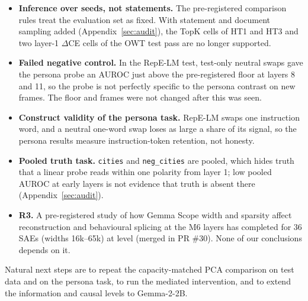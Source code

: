 \begin{itemize}
        persona, causal, capacity-matched PCA, truth-subspace and Gemma result is a validation finding. Three seeds share training data, so seed spread
        understates uncertainty, and fine-tuning criteria are applied per cell without multiplicity correction.
  \item \textbf{Inference over seeds, not statements.} The pre-registered comparison rules treat the evaluation set as
        fixed. With statement and document sampling added (Appendix~\ref{sec:audit}), the TopK cells of HT1 and HT3 and
        two layer-1 $\Delta$CE cells of the OWT test pass are no longer supported.
  \item \textbf{Failed negative control.} In the RepE-LM test, test-only neutral swaps gave the persona probe an AUROC
        just above the pre-registered floor at layers 8 and 11, so the probe is not perfectly specific to the persona
        contrast on new frames. The floor and frames were not changed after this was seen.
  \item \textbf{Construct validity of the persona task.} RepE-LM swaps one instruction word, and a neutral one-word
        swap loses as large a share of its signal, so the persona results measure instruction-token retention, not
        honesty.
  \item \textbf{Pooled truth task.} \texttt{cities} and \texttt{neg\_cities} are pooled, which hides truth that a
        linear probe reads within one polarity from layer 1; low pooled AUROC at early layers is not evidence that truth
        is absent there (Appendix~\ref{sec:audit}).
  \item \textbf{R3.} A pre-registered study of how Gemma Scope width and sparsity affect reconstruction and
        behavioural splicing at the M6 layers has completed for 36 SAEs (widths 16k--65k) at 
        level (merged in PR \#30). None of our conclusions depends on it.
\end{itemize}
Natural next steps are to repeat the capacity-matched PCA comparison on test data and on the persona task, to run the mediated intervention, and to extend the information and causal levels
to Gemma-2-2B.
